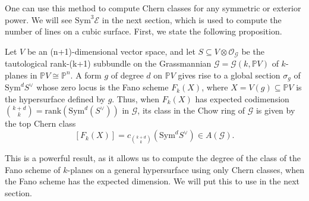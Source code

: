 One can use this method to compute Chern classes for any symmetric or exterior power. We will see $\mathrm{Sym}^3 \mathcal{E}$ in the next section, which is used to compute the number of lines on a cubic surface. First, we state the following proposition.


    



\begin{proposition}\label{prop:degF}
    Let $V$ be an (n+1)-dimensional vector space, and let $S \subseteq V \otimes \mathcal{O}_\mathcal{G}$ be the tautological rank-(k+1) subbundle on the Grassmannian $\mathcal{G} = \mathcal{G}(k,\mathbb{P}V)$ of $k$-planes in $\mathbb{P}V \cong \mathbb{P}^n$. A form $g$ of degree $d$ on $\mathbb{P}V$ gives rise to a global section $\sigma_g$ of $\mathrm{Sym}^d S^\vee$ whose zero locus is the Fano scheme $F_k(X)$, where $X = V(g) \subseteq \mathbb{P}V$ is the hypersurface defined by $g$. Thus, when $F_k(X)$ has expected codimension $\binom{k+d}{k} = \mathrm{rank}(\mathrm{Sym}^d(S^\vee))$ in $\mathcal{G}$, its class in the Chow ring of $\mathcal{G}$ is given by the top Chern class
    \[[F_k(X)] = c_{\binom{k+d}{k}}(\mathrm{Sym}^d S^\vee) \in A(\mathcal{G}).\]
\end{proposition}

This is a powerful result, as it allows us to compute the degree of the class of the Fano scheme of $k$-planes on a general hypersurface using only Chern classes, when the Fano scheme has the expected dimension. We will put this to use in the next section.



